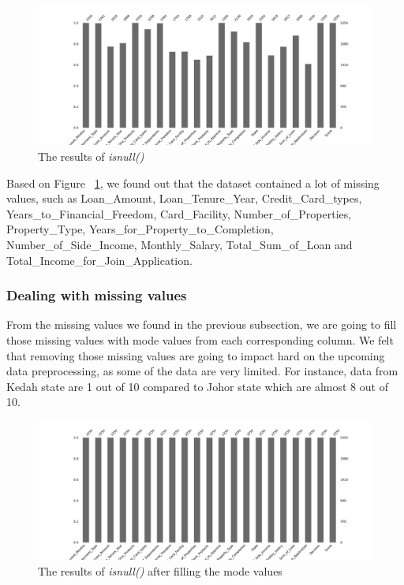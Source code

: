 \documentclass[11pt]{article}
\begin{document}
\begin{figure}[h]
\centerline{\includegraphics[scale=0.2]{missing_val.png}}
\caption{The results of \textit{isnull()}}
\label{fig:isNull}
\end{figure}

Based on Figure ~\ref{fig:isNull}, we found out that the dataset contained a lot of missing values, such as Loan\_Amount, Loan\_Tenure\_Year, Credit\_Card\_types, Years\_to\_Financial\_Freedom, Card\_Facility, Number\_of\_Properties, Property\_Type, Years\_for\_Property\_to\_Completion, Number\_of\_Side\_Income, Monthly\_Salary, Total\_Sum\_of\_Loan and Total\_Income\_for\_Join\_Application.

\clearpage
\subsubsection{Dealing with missing values}
From the missing values we found in the previous subsection, we are going to fill those missing values with mode values from each corresponding column. We felt that removing those missing values are going to impact hard on the upcoming data preprocessing, as some of the data are very limited. For instance, data from Kedah state are 1 out of 10 compared to Johor state which are almost 8 out of 10. 

\begin{figure}[h]
\centerline{\includegraphics[scale=0.2]{filled_missing_val.png}}
\caption{The results of \textit{isnull()} after filling the mode values}
\label{fig:filledIsNull}
\end{figure}
\end{document}
